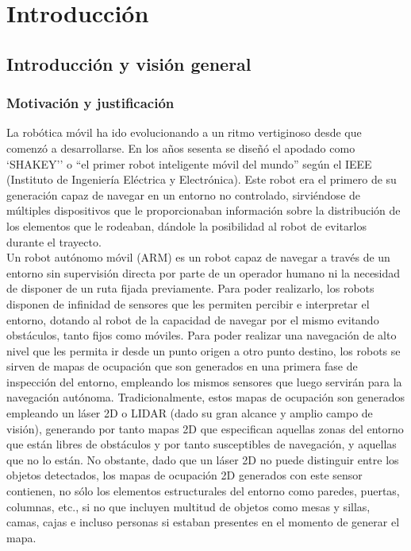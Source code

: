 \part{Introducción}

\chapter{Introducción y visión general}

\section{Motivación y justificación}

La robótica móvil ha ido evolucionando a un ritmo vertiginoso desde que comenzó a desarrollarse. En los años sesenta se diseñó el apodado como `SHAKEY'' o ``el primer robot inteligente móvil del mundo'' según el IEEE (Instituto de Ingeniería Eléctrica y Electrónica). Este robot era el primero de su generación capaz de navegar en un entorno no controlado, sirviéndose de múltiples dispositivos que le proporcionaban información sobre la distribución de los elementos que le rodeaban, dándole la posibilidad al robot de evitarlos durante el trayecto.\\

Un robot autónomo móvil (ARM) es un robot capaz de navegar a través de un entorno sin supervisión directa por parte de un operador humano ni la necesidad de disponer de un ruta fijada previamente. Para poder realizarlo, los robots disponen de infinidad de sensores que les permiten percibir e interpretar el entorno, dotando al robot de la capacidad de navegar por el mismo evitando obstáculos, tanto fijos como móviles. Para poder realizar una navegación de alto nivel que les permita ir desde un punto origen a otro punto destino, los robots se sirven de mapas de ocupación que son generados en una primera fase de inspección del entorno, empleando los mismos sensores que luego servirán para la navegación autónoma. Tradicionalmente, estos mapas de ocupación son generados empleando un láser 2D o LIDAR (dado su gran alcance y amplio campo de visión), generando por tanto mapas 2D que especifican aquellas zonas del entorno que están libres de obstáculos y por tanto susceptibles de navegación, y aquellas que no lo están. No obstante, dado que un láser 2D no puede distinguir entre los objetos detectados, los mapas de ocupación 2D generados con este sensor contienen, no sólo los elementos estructurales del entorno como paredes, puertas, columnas, etc., si no que incluyen multitud de objetos como mesas y sillas, camas, cajas e incluso personas si estaban presentes en el momento de generar el mapa.\\

